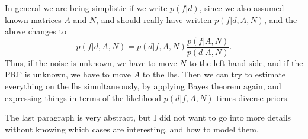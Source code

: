 \documentclass{article}
\begin{document}
In general we are being simplistic if we write $p(f|d)$, since we also assumed known
matrices $A$ and $N$, and should really have written $p(f|d,A,N)$, and the above
changes to
\[
p(f|d,A,N) = p(d|f,A,N) \frac{p(f|A,N)}{p(d|A,N)} .
\]
Thus, if the noise is unknown, we have to move $N$ to the left hand side, and if
the PRF is unknown, we have to move $A$ to the lhs. Then we can try to estimate
everything on the lhs simultaneously, by applying Bayes theorem again, and expressing
things in terms of the likelihood $p(d|f,A,N)$ times diverse priors.

The last paragraph is very abstract, but I did not want to go into more details
without knowing which cases are interesting, and how to model them.
\end{document}
